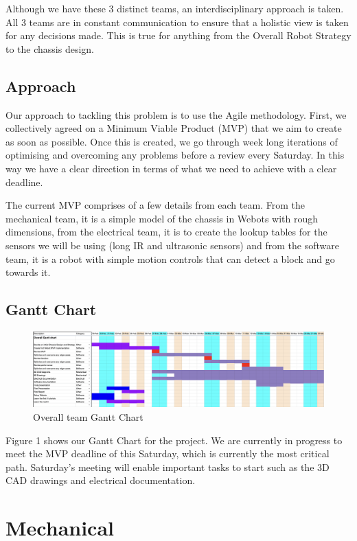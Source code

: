 Although we have these 3 distinct teams, an interdisciplinary approach is taken. All 3 teams are in constant communication to ensure that a holistic view is taken for any decisions made. This is true for anything from the Overall Robot Strategy to the chassis design.

\subsection{Approach}

Our approach to tackling this problem is to use the Agile methodology. First, we collectively agreed on a Minimum Viable Product (MVP) that we aim to create as soon as possible. Once this is created, we go through week long iterations of optimising and overcoming any problems before a review every Saturday. In this way we have a clear direction in terms of what we need to achieve with a clear deadline.

The current MVP comprises of a few details from each team. From the mechanical team, it is a simple model of the chassis in Webots with rough dimensions, from the electrical team, it is to create the lookup tables for the sensors we will be using (long IR and ultrasonic sensors) and from the software team, it is a robot with simple motion controls that can detect a block and go towards it.

\subsection{Gantt Chart}

\begin{figure}[H]
    \centering
    \includegraphics[width=14cm]{GanttChart}
    \caption{Overall team Gantt Chart}
\end{figure}

Figure 1 shows our Gantt Chart for the project. We are currently in progress to meet the MVP deadline of this Saturday, which is currently the most critical path. Saturday's meeting will enable important tasks to start such as the 3D CAD drawings and electrical documentation.
\section{Mechanical}
